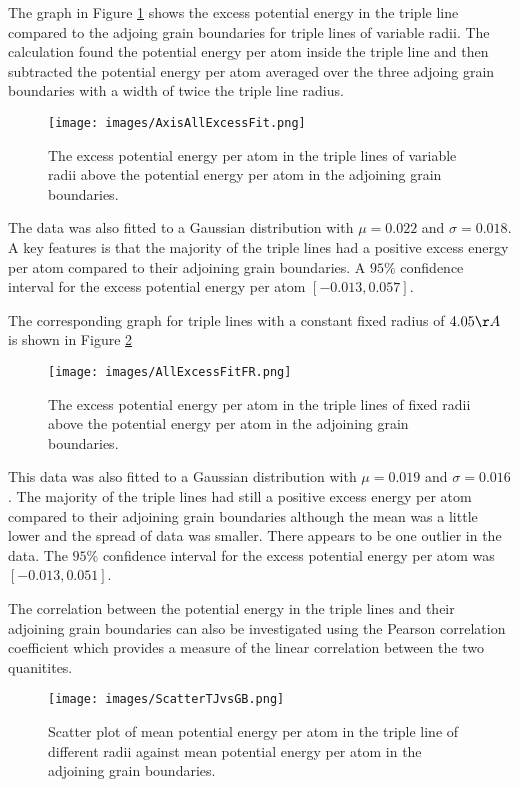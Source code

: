 \documentclass[12pt,a4paper]{book}
\begin{document}
The graph in Figure \ref{fig:ExcessPEVR} shows the excess potential energy in the triple line compared to the adjoing grain boundaries for triple lines of variable radii. The calculation found the potential energy per atom inside the triple line and then subtracted the potential energy per atom averaged over the three adjoing grain boundaries with a width of twice the triple line radius.
 

\begin{figure}[H]
	\texttt{[image: images/AxisAllExcessFit.png]}
	\label{fig:ExcessPEVR}
	\caption{The excess potential energy per atom in the triple lines of variable radii above the potential energy per atom in the adjoining grain boundaries.} 
\end{figure}

The data was also fitted to a Gaussian distribution with $\mu = 0.022$ and $\sigma = 0.018$. A key features is that the majority of the triple lines had a positive excess energy per atom compared to their adjoining grain boundaries. A $95\%$ confidence interval for the excess potential energy per atom
$[-0.013, 0.057]$.

The corresponding graph for triple lines with a constant fixed radius of $4.05 \AA$ is shown in Figure \ref{fig:ExcessPEFR}

\begin{figure}[H]
	\texttt{[image: images/AllExcessFitFR.png]} 
	\label{fig:ExcessPEFR}
	\caption{The excess potential energy per atom in the triple lines of fixed radii above the potential energy per atom in the adjoining grain boundaries.}
\end{figure}

This data was also fitted to a Gaussian distribution with $\mu = 0.019$ and $\sigma = 0.016$. The majority of the triple lines had still a positive excess energy per atom compared to their adjoining grain boundaries although the mean was a little lower and the spread of data was smaller. There appears to be one outlier in the data. The $95\%$ confidence interval for the excess potential energy per atom was $[-0.013, 0.051]$.


The correlation between the potential energy in the triple lines and their adjoining grain boundaries can also be investigated using the Pearson correlation coefficient which provides a measure of the linear correlation between the two quanitites.

\begin{figure}[H]
	\texttt{[image: images/ScatterTJvsGB.png]} 
	\label{fig:ScatterTJvsGB}
	\caption{Scatter plot of mean potential energy per atom in the triple line of different radii against mean potential energy per atom in the adjoining grain boundaries.}
\end{figure}
\end{document}
